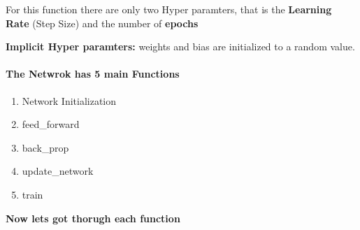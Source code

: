 \documentclass[11pt]{article}
\providecommand{\tightlist}{%
      \setlength{\itemsep}{0pt}\setlength{\parskip}{0pt}}
\begin{document}
For this function there are only two Hyper paramters, that is the
\textbf{Learning Rate} (Step Size) and the number of \textbf{epochs}

\textbf{Implicit Hyper paramters:} weights and bias are initialized to a
random value.

\paragraph{The Netwrok has 5 main
Functions}\label{the-netwrok-has-5-main-functions}

\begin{enumerate}
\def\labelenumi{\arabic{enumi})}
\tightlist
\item
  Network Initialization
\item
  feed\_forward
\item
  back\_prop
\item
  update\_network
\item
  train
\end{enumerate}

\textbf{Now lets got thorugh each function}
\end{document}
